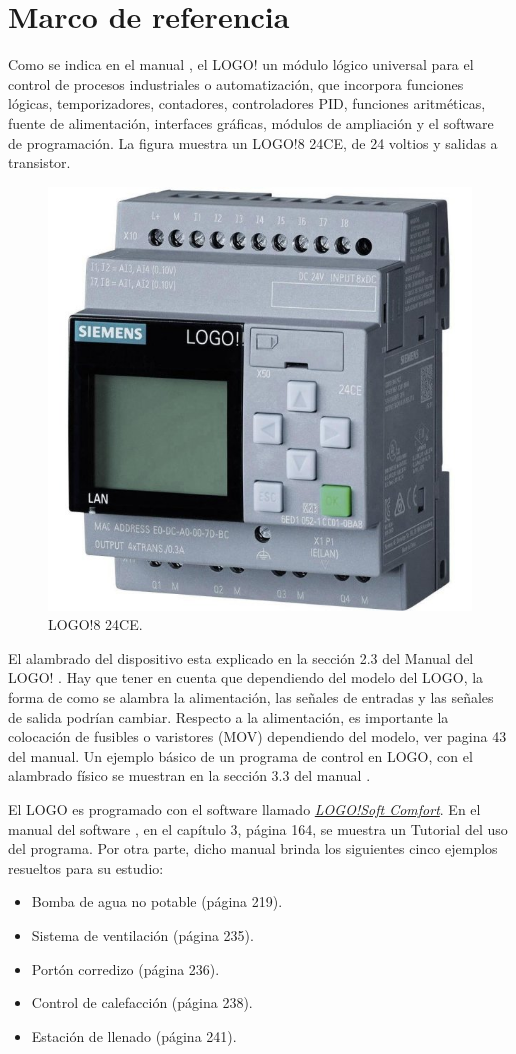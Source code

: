 \section{Marco de referencia}

Como se indica en el manual \cite{LOGO1}, el LOGO! un módulo lógico universal para el control de procesos industriales o automatización, que incorpora funciones lógicas, temporizadores, contadores, controladores PID, funciones aritméticas, fuente de alimentación, interfaces gráficas, módulos de ampliación y el software de programación. La figura muestra un LOGO!8 24CE, de 24 voltios y salidas a transistor.
\begin{figure}
	\centering
	\includegraphics[width=0.5\linewidth]{Imagenes/Logo!8}
	\caption{LOGO!8 24CE.}
	\label{fig:logo8}
\end{figure}

 El alambrado del dispositivo esta explicado en la sección 2.3 del Manual del LOGO! \cite{LOGO1}. Hay que tener en cuenta que dependiendo del modelo del LOGO, la forma de como se alambra la alimentación, las señales de entradas y las señales de salida podrían cambiar. Respecto a la alimentación, es importante la colocación de fusibles o varistores (MOV) dependiendo del modelo, ver pagina 43 del manual.  Un ejemplo básico de un programa de control en LOGO, con el alambrado físico se muestran en la sección 3.3 del manual \cite{LOGO1}.
 
 El LOGO es programado con el software llamado \href{https://new.siemens.com/global/en/products/automation/systems/industrial/plc/logo/logo-software.html}{\textit{LOGO!Soft Comfort}}. En el manual del software \cite{LOGO2}, en el capítulo 3, página 164, se muestra un Tutorial del uso del programa. Por otra parte, dicho manual brinda los siguientes cinco ejemplos resueltos para su estudio:
 
\begin{itemize}
	\item Bomba de agua no potable (página 219).
	\item Sistema de ventilación (página 235).
	\item Portón corredizo (página 236).
	\item Control de calefacción (página 238).
	\item Estación de llenado (página 241).	
\end{itemize}
 
